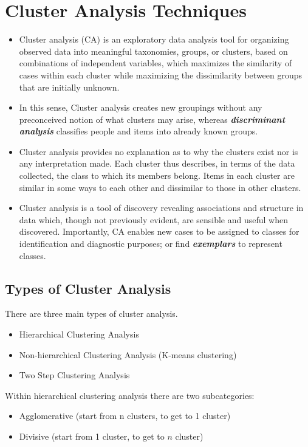\documentclass[a4paper,12pt]{article}
\begin{document}
\section{Cluster Analysis Techniques}
\begin{itemize}
\item Cluster analysis (CA) is an exploratory data analysis tool for organizing observed data into meaningful taxonomies, groups, or
clusters, based on combinations of independent variables, which maximizes the similarity of cases within
each cluster while maximizing the dissimilarity between groups that are initially unknown.

\item In this sense, Cluster analysis creates new groupings without any preconceived notion of what clusters
may arise, whereas \textit{\textbf{discriminant analysis}} classifies people and items into
already known groups.

\item Cluster analysis provides no explanation as to why the clusters exist nor is any
interpretation made. Each cluster thus describes, in terms of the data collected, the class to
which its members belong. Items in each cluster are similar in some ways to each other and
dissimilar to those in other clusters.

\item Cluster analysis is a tool of discovery revealing associations and structure in data which, though not previously
evident, are sensible and useful when discovered. Importantly, CA enables new
cases to be assigned to classes for identification and diagnostic purposes; or find \textbf{\textit{exemplars}}
to represent classes.
\end{itemize}

\subsection{Types of Cluster Analysis}
There are three main types of cluster analysis.
\begin{itemize}
\item Hierarchical Clustering Analysis
\item Non-hierarchical Clustering Analysis (K-means clustering)
\item Two Step Clustering Analysis
\end{itemize}

Within hierarchical clustering analysis there are two subcategories: 
\begin{itemize}
\item Agglomerative (start from n clusters, to get to 1 cluster)
\item Divisive (start from 1 cluster, to get to $n$ cluster)
\end{itemize}
\end{document}
